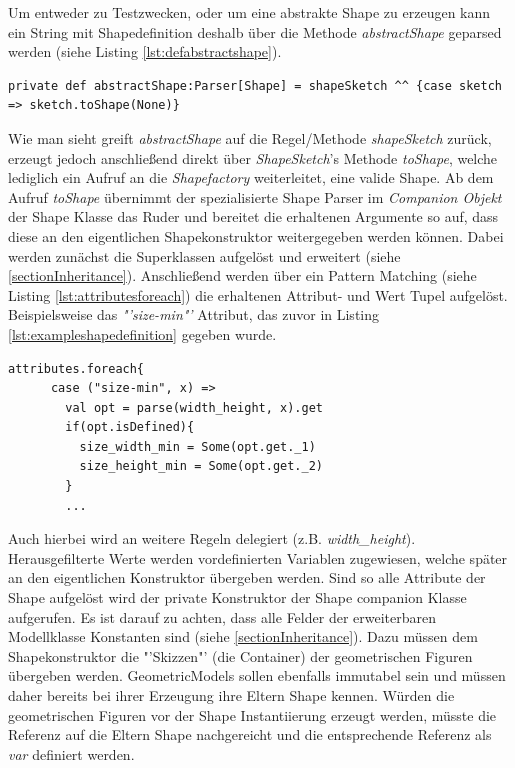 Um entweder zu Testzwecken, oder um eine abstrakte Shape zu erzeugen kann ein String mit Shapedefinition deshalb über die Methode \textit{abstractShape} geparsed werden (siehe Listing \ref{lst:defabstractshape}).
\begin{lstlisting}[style=scala, caption = {Auszug aus Code Methode zum direkten Parsen von Shapes}, label = {lst:defabstractshape}]
private def abstractShape:Parser[Shape] = shapeSketch ^^ {case sketch => sketch.toShape(None)}
\end{lstlisting}Wie man sieht greift \textit{abstractShape} auf die Regel/Methode \textit{shapeSketch} zurück, erzeugt jedoch anschließend direkt über \textit{ShapeSketch}'s Methode \textit{toShape}, welche lediglich ein Aufruf an die \textit{Shapefactory} weiterleitet, eine valide Shape. Ab dem Aufruf \textit{toShape} übernimmt der spezialisierte Shape Parser im \textit{Companion Objekt} der Shape Klasse das Ruder und bereitet die erhaltenen Argumente so auf, dass diese an den eigentlichen Shapekonstruktor weitergegeben werden können. Dabei werden zunächst die Superklassen aufgelöst und erweitert (siehe \ref{sectionInheritance}). Anschließend werden über ein Pattern Matching (siehe Listing \ref{lst:attributesforeach}) die erhaltenen Attribut- und Wert Tupel aufgelöst. Beispielsweise das \textit{"'size-min"'} Attribut, das zuvor in Listing \ref{lst:exampleshapedefinition} gegeben wurde. 
\begin{lstlisting}[style=scala, caption = {Auszug aus Code Iterieren durch Attribute mit Pattern Matching}, label = {lst:attributesforeach}]
attributes.foreach{
      case ("size-min", x) =>
        val opt = parse(width_height, x).get
        if(opt.isDefined){
          size_width_min = Some(opt.get._1)
          size_height_min = Some(opt.get._2)
        }
        ...
\end{lstlisting}Auch hierbei wird an weitere Regeln delegiert (z.B. \textit{width\_height}). Herausgefilterte Werte werden vordefinierten Variablen zugewiesen, welche später an den eigentlichen Konstruktor übergeben werden. Sind so alle Attribute der Shape aufgelöst wird der private Konstruktor der Shape companion Klasse aufgerufen. Es ist darauf zu achten, dass alle Felder der erweiterbaren Modellklasse Konstanten sind (siehe \ref{sectionInheritance}). Dazu müssen dem Shapekonstruktor die "'Skizzen"' (die Container) der geometrischen Figuren übergeben werden. GeometricModels sollen ebenfalls immutabel sein und müssen daher bereits bei ihrer Erzeugung ihre Eltern Shape kennen. Würden die geometrischen Figuren vor der Shape Instantiierung erzeugt werden, müsste die Referenz auf die Eltern Shape nachgereicht  und die entsprechende Referenz als \textit{var} definiert werden.
